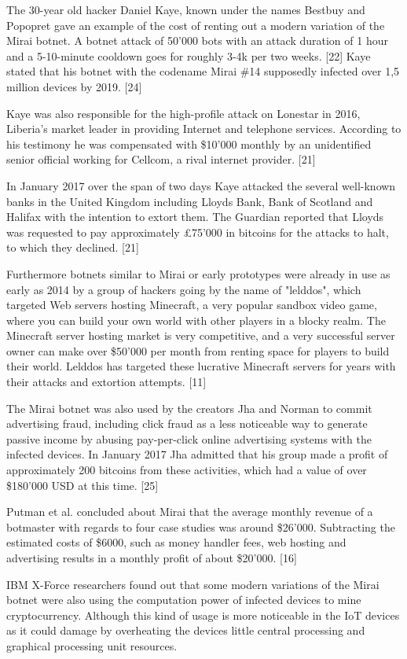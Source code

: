 The 30-year old hacker Daniel Kaye, known under the names Bestbuy and Popopret gave an example of the cost of renting out a modern variation of the Mirai botnet. A botnet attack of 50'000 bots with an attack duration of 1 hour and a 5-10-minute cooldown goes for roughly 3-4k per two weeks. [22] Kaye stated that his botnet with the codename Mirai \#14 supposedly infected over 1,5 million devices by 2019. [24]

Kaye was also responsible for the high-profile attack on Lonestar in 2016, Liberia's market leader in providing Internet and telephone services. According to his testimony he was compensated with \$10'000 monthly by an unidentified senior official working for Cellcom, a rival internet provider. [21]

In January 2017 over the span of two days Kaye attacked the several well-known banks in the United Kingdom including Lloyds Bank, Bank of Scotland and Halifax with the intention to extort them. The Guardian reported that Lloyds was requested to pay approximately £75'000 in bitcoins for the attacks to halt, to which they declined. [21]

Furthermore botnets similar to Mirai or early prototypes were already in use as early as 2014 by a group of hackers going by the name of "lelddos", which targeted Web servers hosting Minecraft, a very popular sandbox video game, where you can build your own world with other players in a blocky realm. The Minecraft server hosting market is very competitive, and a very successful server owner can make over \$50'000 per month from renting space for players to build their world. Lelddos has targeted these lucrative Minecraft servers for years with their attacks and extortion attempts. [11]

The Mirai botnet was also used by the creators Jha and Norman to commit advertising fraud, including click fraud as a less noticeable way to generate passive income by abusing pay-per-click online advertising systems with the infected devices. In January 2017 Jha admitted that his group made a profit of approximately 200 bitcoins from these activities, which had a value of over \$180'000 USD at this time. [25]

Putman et al. concluded about Mirai that the average monthly revenue of a botmaster with regards to four case studies was around \$26'000. Subtracting the estimated costs of \$6000, such as money handler fees, web hosting and advertising results in a monthly profit of about \$20'000. [16]

IBM X-Force researchers found out that some modern variations of the Mirai botnet were also using the computation power of infected devices to mine cryptocurrency. Although this kind of usage is more noticeable in the IoT devices as it could damage by overheating the devices little central processing and graphical processing unit resources. \cite{DeBeck19}

